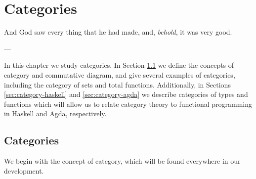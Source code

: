 \chapter{Categories}
\label{chap:categories}

\epigraph{
  And God saw every thing that he had made, and, \emph{behold}, it was
  very good.
}{---\textcite[Genesis 1:31]{god-1769}}

In this chapter we study categories. In Section \ref{sec:categories}
we define the concepts of category and commutative diagram, and give
several examples of categories, including the category of sets and
total functions. Additionally, in Sections \ref{sec:category-haskell}
and \ref{sec:category-agda} we describe categories of types and
functions which will allow us to relate category theory to functional
programming in Haskell and Agda, respectively.

\section{Categories}
\label{sec:categories}

We begin with the concept of category, which will be found everywhere
in our development.

